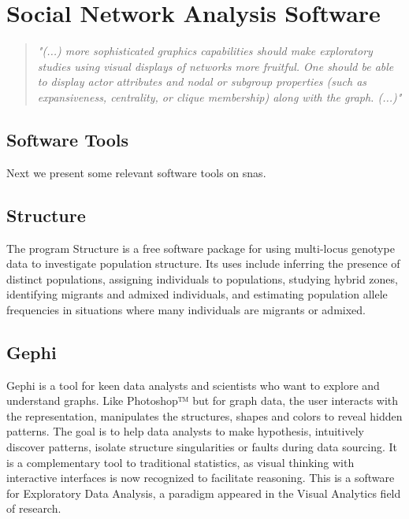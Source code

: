 \section{Social Network Analysis Software}
\label{sec:snas}

\begin{quote}
\textit{"(...) more sophisticated graphics capabilities should make exploratory studies using visual displays of networks more fruitful. One should be able to display actor attributes and nodal or subgroup properties (such as expansiveness, centrality, or clique membership) along with the graph. (...)"} \cite{wasserman1994social}
\end{quote}

\subsection{Software Tools}
Next we present some relevant software tools on \glspl{sna}.

\subsection{Structure}

\indent \indent The program Structure \cite{structure-software} is a free software package for using multi-locus genotype data to investigate population structure. Its uses include inferring the presence of distinct populations, assigning individuals to populations, studying hybrid zones, identifying migrants and admixed individuals, and estimating population allele frequencies in situations where many individuals are migrants or admixed.

\subsection{Gephi}

\indent \indent Gephi \cite{bastian2009gephi} is a tool for keen data analysts and scientists who want to explore and understand graphs. Like Photoshop™ but for graph data, the user interacts with the representation, manipulates the structures, shapes and colors to reveal hidden patterns. The goal is to help data analysts to make hypothesis, intuitively discover patterns, isolate structure singularities or faults during data sourcing. It is a complementary tool to traditional statistics, as visual thinking with interactive interfaces is now recognized to facilitate reasoning. This is a software for Exploratory Data Analysis, a paradigm appeared in the Visual Analytics field of research.

